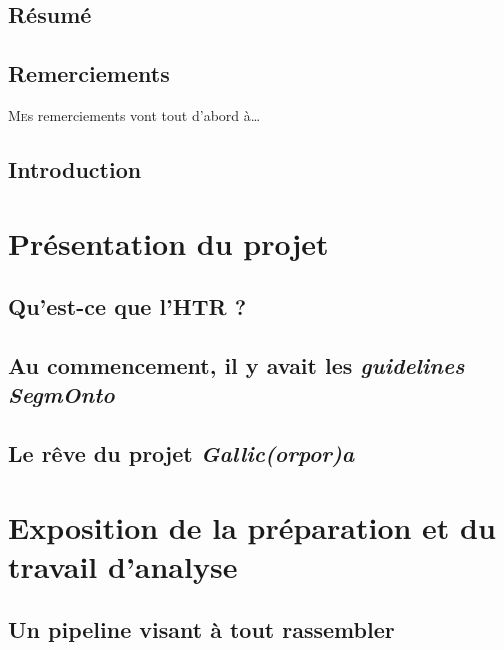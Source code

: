 \documentclass[a4paper,12pt,twoside]{book}
\begin{document}
	\frontmatter
	
	\chapter{Résumé}
	
	
	\chapter{Remerciements}
	\lettrine{M}es remerciements vont tout d'abord à\dots
	
	
	\chapter{Introduction}
	
	
	\thispagestyle{empty}
	\cleardoublepage
	
	\mainmatter
	
	\part{Présentation du projet}
	
	\chapter{Qu'est-ce que l'HTR ?}
	
	
	\chapter{Au commencement, il y avait les \textit{guidelines SegmOnto}}
	

	\chapter{Le rêve du projet \textit{Gallic(orpor)a}}
	
	
	
	\part{Exposition de la préparation et du travail d'analyse}

	\chapter{Un pipeline visant à tout rassembler}
	
	
\end{document}
